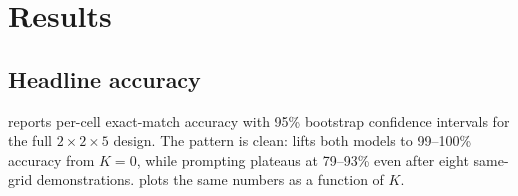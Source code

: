 \section{Results}
\label{sec:results}

\subsection{Headline accuracy}

 reports per-cell exact-match accuracy with 95\%
bootstrap confidence intervals for the full $2 \times 2 \times 5$
design. The pattern is clean: \COT lifts both models to 99--100\%
accuracy from $K{=}0$, while \Direct prompting plateaus at 79--93\%
even after eight same-grid demonstrations.
 plots the same numbers as a function of $K$.

\begin{table}[t]
\centering
\caption{Per-cell exact-match accuracy on \addrtask
($n{=}80$ per cell, 95\% bootstrap CIs). \COT is at or near ceiling
across both models and every $K$; \Direct plateaus well below ceiling.
Best per row in \textbf{bold}.}
\label{tab:main}
\end{table}

